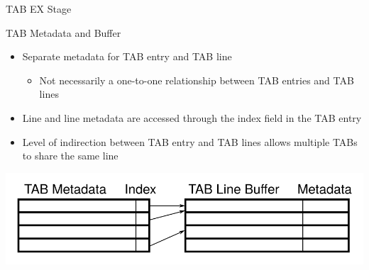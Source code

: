 \documentclass{beamer}
\begin{document}
\begin{frame}{TAB EX Stage}
   \begin{block}{TAB Metadata and Buffer}
      \begin{itemize}
         \item Separate metadata for TAB entry and TAB line
            \begin{itemize}
               \item Not necessarily a one-to-one relationship
                  between TAB entries and TAB lines
            \end{itemize}
         \item Line and line metadata are accessed through the index field 
            in the TAB entry
         \item Level of indirection between TAB entry and TAB lines allows
            multiple TABs to share the same line
      \end{itemize}
   \end{block}
   \includegraphics[width=\textwidth]{figures/tabhardware_EX.pdf}
\end{frame}
\end{document}
